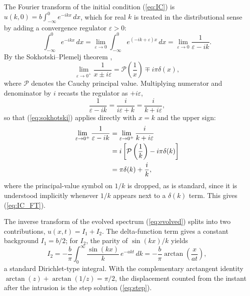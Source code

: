 \documentclass[extra]{gji}
\begin{document}
The Fourier transform of the initial condition (\ref{eq:IC}) is
$\hat{u}(k,0) = b\int_{-\infty}^{0}e^{-ikx}\,dx$, which for real $k$ is
treated in the distributional sense by adding a convergence regulator
$\varepsilon > 0$:
\begin{equation*}
\int_{-\infty}^{0}e^{-ikx}\,dx
= \lim_{\varepsilon\to 0}\int_{-\infty}^{0}e^{(-ik+\varepsilon)x}\,dx
= \lim_{\varepsilon\to 0}\frac{1}{\varepsilon - ik}.
\end{equation*}
By the Sokhotski--Plemelj theorem \citep{ablowitz2003complex},
\begin{equation}
\lim_{\varepsilon\to 0^+}\frac{1}{x \pm i\varepsilon} = \mathcal{P}\left(\frac{1}{x}\right) \mp i\pi\delta(x),
\label{eq:sokhotski}
\end{equation}
where $\mathcal{P}$ denotes the Cauchy principal value. Multiplying numerator
and denominator by $i$ recasts the regulator as $+i\varepsilon$,
\begin{equation*}
\frac{1}{\varepsilon - ik} = \frac{i}{i\varepsilon + k} = \frac{i}{k + i\varepsilon},
\end{equation*}
so that (\ref{eq:sokhotski}) applies directly with $x = k$ and the upper sign:
\begin{align}
\lim_{\varepsilon\to 0^+}\frac{1}{\varepsilon - ik}
&= \lim_{\varepsilon\to 0^+}\frac{i}{k + i\varepsilon} \notag\\
&= i\left[\mathcal{P}\left(\frac{1}{k}\right) - i\pi\delta(k)\right] \notag\\
&= \pi\delta(k) + \frac{i}{k}, \label{eq:sokhotski_applied}
\end{align}
where the principal-value symbol on $1/k$ is dropped, as is standard, since
it is understood implicitly whenever $1/k$ appears next to a $\delta(k)$
term. This gives (\ref{eq:IC_FT}).

The inverse transform of the evolved spectrum (\ref{eq:evolved}) splits into
two contributions, $u(x,t) = I_1 + I_2$. The delta-function term gives a
constant background $I_1 = b/2$; for $I_2$, the parity of $\sin(kx)/k$
yields
\begin{equation}
I_2 = -\frac{b}{\pi}\int_0^{\infty}\frac{\sin(kx)}{k}\,e^{-akt}\,dk
    = -\frac{b}{\pi}\arctan\!\left(\frac{x}{at}\right),
\label{eq:I2}
\end{equation}
a standard Dirichlet-type integral. With the complementary arctangent
identity $\arctan(z)+\arctan(1/z)=\pi/2$, the displacement counted from the
instant after the intrusion is the step solution (\ref{eq:step}).
\end{document}
